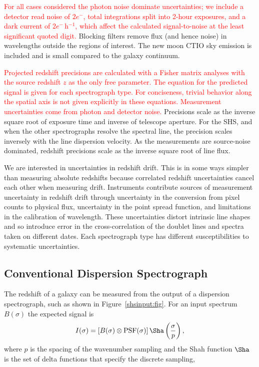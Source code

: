 \documentclass[preprint2, 10pt]{aastex}
\begin{document}
\textcolor{red}{
For all cases considered the photon noise dominate uncertainties;
we include a detector read noise of $2e^-$, total integrations split into 2-hour exposures, and a dark current of $2e^-$\,h$^{-1}$,
which affect the calculated signal-to-noise at the least significant quoted digit.} 
Blocking filters remove flux (and hence noise) in wavelengths outside the regions
of interest.  The new moon CTIO sky emission is included and
is small compared to the galaxy continuum.


\textcolor{red}{
Projected redshift precisions are calculated with a Fisher matrix
analyses with the source redshift $z$ as the only free parameter.  The
equation for the predicted signal is given for each spectrograph type.
For conciseness, trivial behavior along the spatial axis is not given
explicitly in these equations.  Measurement uncertainties come from
photon and detector noise.
}
Precisions scale as the inverse square root of exposure time and inverse of telescope aperture. 
For the SHS, and when the other spectrographs resolve the spectral line, the precision scales 
inversely 
with the line dispersion velocity.  
As the measurements
are source-noise dominated, redshift precisions scale as the inverse square 
root
of line flux. 


We are interested in uncertainties in redshift drift.
This is in some ways simpler than measuring absolute redshifts
because correlated redshift uncertainties cancel each other when measuring drift.
Instruments contribute sources of measurement uncertainty in redshift drift through 
uncertainty in the conversion from pixel counts to physical flux, uncertainty in the point spread function,
and limitations in the calibration
of wavelength.   These uncertainties distort intrinsic line shapes and so introduce error in the cross-correlation
of the doublet lines and spectra taken on different dates. 
Each spectrograph type
has different susceptibilities to systematic uncertainties.


\subsection{Conventional Dispersion Spectrograph} \label{sec:dispspec} 

The redshift of a galaxy can be measured from the output of a dispersion spectrograph, such as shown in Figure~\ref{shsinput:fig}.
For an input spectrum $B(\sigma)$ the expected signal is
\begin{equation}
I(\sigma) = \left[B(\sigma)\otimes \mbox{PSF}(\sigma)\right]\Sha\left(\frac{\sigma}{p}\right),
\label{conventional:eqn}
\end{equation}
where $p$ is the spacing of the wavenumber sampling and the Shah function $\Sha$ is the set of delta functions
that specify the discrete sampling,
\end{document}
